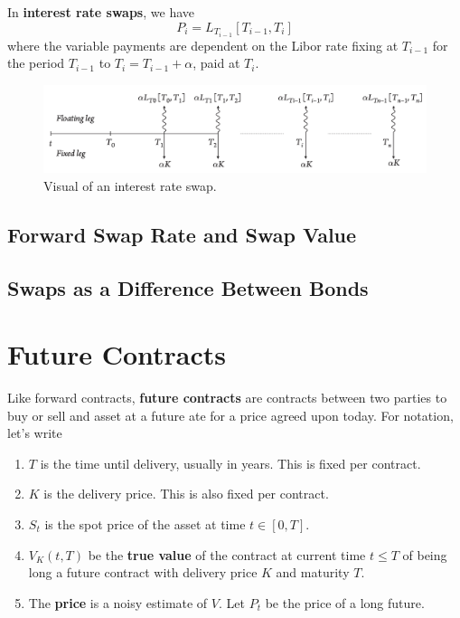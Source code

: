 \documentclass{article}
\begin{document}
    \begin{definition}
      In \textbf{interest rate swaps}, we have 
      \begin{equation}
        P_i = L_{T_{i-1}} [T_{i-1}, T_{i}]
      \end{equation}
      where the variable payments are dependent on the Libor rate fixing at $T_{i-1}$ for the period $T_{i-1}$ to $T_{i} = T_{i-1} + \alpha$, paid at $T_i$. 
      \begin{figure}[H]
        \centering 
        \includegraphics[scale=0.4]{img/interest_rate_swap.png}
        \caption{Visual of an interest rate swap. } 
        \label{fig:interest_rate_swap}
      \end{figure}
    \end{definition}

    \begin{definition}
      
    \end{definition}

  \subsection{Forward Swap Rate and Swap Value}

  \subsection{Swaps as a Difference Between Bonds}

\section{Future Contracts}

  \begin{definition}[Futures]
    Like forward contracts, \textbf{future contracts} are contracts between two parties to buy or sell and asset at a future ate for a price agreed upon today. For notation, let's write 
    \begin{enumerate}
      \item $T$ is the time until delivery, usually in years. This is fixed per contract. 
      \item $K$ is the delivery price. This is also fixed per contract. 
      \item $S_t$ is the spot price of the asset at time $t \in [0, T]$. 
      \item $V_K (t, T)$ be the \textbf{true value} of the contract at current time $t \leq T$ of being long a future contract with delivery price $K$ and maturity $T$. 
      \item The \textbf{price} is a noisy estimate of $V$. Let $P_t$ be the price of a long future.
    \end{enumerate}
  \end{definition}
  
\end{document}
